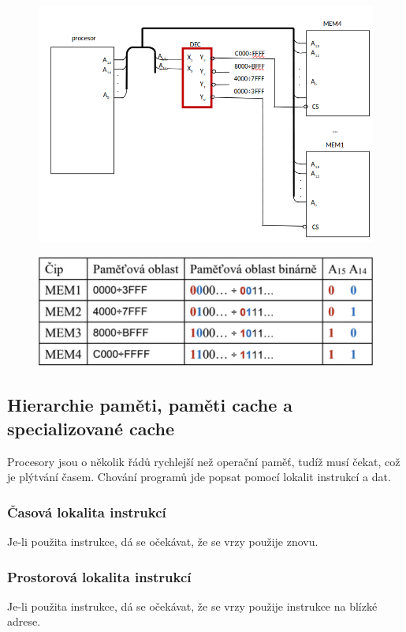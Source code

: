 \begin{figure}[h!]
    \centering
    \includegraphics[scale = 0.35]{img/AdrDekoder.png}
\end{figure}
\newpage
\begin{figure}
    \centering
    \includegraphics*[width = \textwidth]{img/AdrDekTab.png}
\end{figure}

\subsection{Hierarchie paměti, paměti cache a specializované cache}
Procesory jsou o několik řádů rychlejší než operační paměť, tudíž musí čekat, což je plýtvání časem.
Chování programů jde popsat pomocí lokalit instrukcí a dat.
\subsubsection*{Časová lokalita instrukcí}
Je-li použita instrukce, dá se očekávat, že se vrzy použije znovu.
\subsubsection*{Prostorová lokalita instrukcí}
Je-li použita instrukce, dá se očekávat, že se vrzy použije instrukce na blízké adrese.

